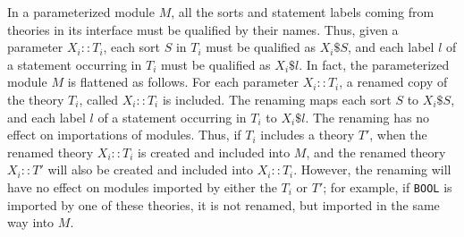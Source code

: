 In a parameterized module $M$, all the sorts and statement labels
coming from theories in its interface must be qualified by their names. Thus,
given a parameter $X_i :: T_i$, each sort $S$ in $T_i$ must be
qualified as $X_i\texttt{\$}S$, and each label $l$ of a statement occurring in
$T_i$ must be qualified as $X_i\texttt{\$}l$. In fact, the parameterized module
$M$ is flattened as follows. For each parameter $X_i :: T_i$, 
a renamed copy of the theory $T_i$, called $X_i :: T_i$ is included.
The renaming  maps each sort $S$ to $X_i\texttt{\$}S$, and each label $l$
of a statement occurring in $T_i$ to $X_i\texttt{\$}l$. The renaming has
no effect on importations of modules. Thus, if $T_i$ includes a theory $T'$,
when the renamed
theory $X_i :: T_i$ is created and included into $M$, and the renamed
theory $X_i :: T'$ will also be created and included into $X_i :: T_i$. 
However, the renaming will have no effect on modules imported by either the
$T_i$ or $T'$; for example, if \verb"BOOL" is imported by one of these
theories, it is not renamed, but imported in the same way into $M$.



















